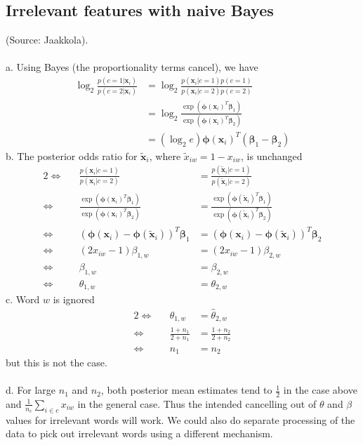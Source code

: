 \subsection{Irrelevant features with naive Bayes}
(Source: Jaakkola).\\\\
a. Using Bayes (the proportionality terms cancel), we have
\begin{align*}
\log_2\frac{p(c=1|\mathbf{x}_i)}{p(c=2|\mathbf{x}_i)} &= \log_2\frac{p(\mathbf{x}_i|c=1)p(c=1)}{p(\mathbf{x}_i|c=2)p(c=2)}\\
&= \log_2\frac{\exp(\bm\phi(\mathbf{x}_i)^T \bm\beta_1)}{\exp(\bm\phi(\mathbf{x}_i)^T \bm\beta_2)}\\
&= (\log_2e)\bm\phi(\mathbf{x}_i)^T(\bm\beta_1-\bm\beta_2)
\end{align*}
b. The posterior odds ratio for $\mathbf{\tilde{x}}_i$, where $\tilde{x}_{iw} = 1-x_{iw}$, is unchanged
\begin{alignat*}{2}
\iff&& \frac{p(\mathbf{x}_i|c=1)}{p(\mathbf{x}_i|c=2)} &= \frac{p(\mathbf{\tilde{x}}_i|c=1)}{p(\mathbf{\tilde{x}}_i|c=2)}\\
\iff&& \frac{\exp(\bm\phi(\mathbf{x}_i)^T \bm\beta_1)}{\exp(\bm\phi(\mathbf{x}_i)^T \bm\beta_2)} &= \frac{\exp(\bm\phi(\mathbf{\tilde{x}}_i)^T \bm\beta_1)}{\exp(\bm\phi(\mathbf{\tilde{x}}_i)^T \bm\beta_2)}\\
\iff&& (\bm\phi(\mathbf{x}_i)-\bm\phi(\mathbf{\tilde{x}}_i))^T \bm\beta_1 &= (\bm\phi(\mathbf{x}_i)-\bm\phi(\mathbf{\tilde{x}}_i))^T \bm\beta_2\\
\iff&& (2x_{iw}-1) \beta_{1,w} &= (2x_{iw}-1) \beta_{2,w}\\
\iff&& \beta_{1,w} &= \beta_{2,w}\\
\iff&& \theta_{1,w} &= \theta_{2,w}
\end{alignat*}
c. Word $w$ is ignored
\begin{alignat*}{2}
\iff&& \hat\theta_{1,w} &= \hat\theta_{2,w}\\
\iff&& \frac{1+n_1}{2+n_1} &= \frac{1+n_2}{2+n_2}\\
\iff&& n_1 &= n_2
\end{alignat*}
but this is not the case.\\\\
d. For large $n_1$ and $n_2$, both posterior mean estimates tend to $\frac{1}{2}$ in the case above and $\frac{1}{n_c}\sum_{i\in c}x_{iw}$ in the general case. Thus the intended cancelling out of $\theta$ and $\beta$ values for irrelevant words will work. We could also do separate processing of the data to pick out irrelevant words using a different mechanism.

